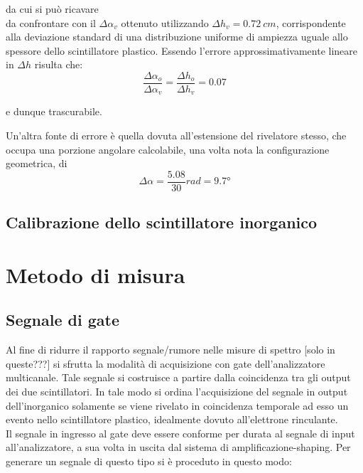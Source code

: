 \documentclass[11pt]{article}
\begin{document}
da cui si può ricavare \\

da confrontare con il $\Delta \alpha_v$ ottenuto utilizzando $\Delta h_v = 0.72 \ cm$, corrispondente alla deviazione standard di una distribuzione uniforme di ampiezza uguale allo spessore dello scintillatore plastico. Essendo l'errore approssimativamente lineare in $\Delta h$ risulta che: \\
\begin{equation}
\frac{\Delta \alpha_o}{\Delta \alpha_v} = \frac{\Delta h_o}{\Delta h_v} = 0.07 
\end{equation}

e dunque trascurabile.

Un'altra fonte di errore è quella dovuta all'estensione del rivelatore stesso, che occupa una porzione angolare calcolabile, una volta nota la configurazione geometrica, di \\
\begin{equation}
\Delta \alpha = \frac{5.08}{30} rad = 9.7°
\nonumber
\end{equation}





\subsection{Calibrazione dello scintillatore inorganico}


\section{Metodo di misura}

\subsection{Segnale di gate}
Al fine di ridurre il rapporto segnale/rumore nelle misure di spettro [solo in queste???] si sfrutta la modalità di acquisizione con gate dell'analizzatore multicanale. Tale segnale si costruisce a partire dalla coincidenza tra gli output dei due scintillatori. In tale modo si ordina l'acquisizione del segnale in output dell'inorganico solamente se viene rivelato in coincidenza temporale ad esso un evento nello scintillatore plastico, idealmente dovuto all'elettrone rinculante.
\\
Il segnale in ingresso al gate deve essere conforme per durata al segnale di input all'analizzatore, a sua volta in uscita dal sistema di amplificazione-shaping. Per generare un segnale di questo tipo si è proceduto in questo modo:
\end{document}

